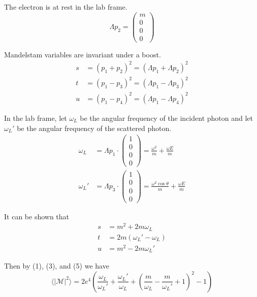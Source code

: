 The electron is at rest in the lab frame.
\begin{equation*}
\Lambda p_2=\begin{pmatrix}m\\0\\0\\0\end{pmatrix}
\end{equation*}

Mandelstam variables are invariant under a boost.
\begin{equation*}
\begin{aligned}
s&=(p_1+p_2)^2=(\Lambda p_1+\Lambda p_2)^2
\\
t&=(p_1-p_3)^2=(\Lambda p_1-\Lambda p_3)^2
\\
u&=(p_1-p_4)^2=(\Lambda p_1-\Lambda p_4)^2
\end{aligned}
\tag{4}
\end{equation*}

In the lab frame, let $\omega_L$ be the angular frequency of the incident photon
and let $\omega_L'$ be the angular frequency of the scattered photon.
\begin{equation*}
\begin{aligned}
\omega_L&=\Lambda p_1\cdot
\begin{pmatrix}1\\0\\0\\0\end{pmatrix}
=\frac{\omega^2}{m}+\frac{\omega E}{m}
\\[1ex]
\omega_L'&=\Lambda p_3\cdot
\begin{pmatrix}1\\0\\0\\0\end{pmatrix}
=\frac{\omega^2\cos\theta}{m}+\frac{\omega E}{m}
\end{aligned}
\end{equation*}

It can be shown that
\begin{equation*}
\begin{aligned}
s&=m^2+2m\omega_L
\\
t&=2m(\omega_L' - \omega_L)
\\
u&=m^2-2 m \omega_L'
\end{aligned}
\tag{5}
\end{equation*}

Then by (1), (3), and (5) we have
\begin{equation*}
\langle|\mathcal{M}|^2\rangle=
2e^4\left(
\frac{\omega_L}{\omega_L'}+\frac{\omega_L'}{\omega_L}
+\left(\frac{m}{\omega_L}-\frac{m}{\omega_L'}+1\right)^2-1
\right)
\tag{6}
\end{equation*}

